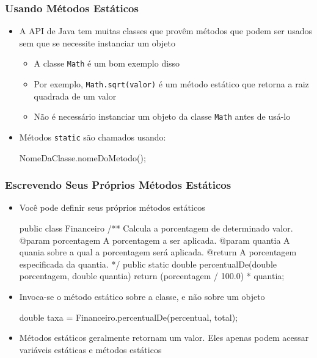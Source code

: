 \documentclass[xcolor={dvipsnames,table},aspectratio=169]{beamer}
\begin{document}
\begin{frame}[fragile]\frametitle{Usando Métodos Estáticos}
\begin{itemize}
	\item A API de Java tem muitas classes que provêm métodos que podem ser usados sem que se necessite instanciar um objeto
	\begin{itemize}
		\item A classe \texttt{Math} é um bom exemplo disso
		\item Por exemplo, \texttt{Math.sqrt(valor)} é um método estático que retorna a raiz quadrada de um valor
		\item Não é necessário instanciar um objeto da classe \texttt{Math} antes de usá-lo
	\end{itemize}
	\item Métodos \texttt{static} são chamados usando:
\begin{javacode}
NomeDaClasse.nomeDoMetodo();
\end{javacode}
\end{itemize}
\end{frame}

\begin{frame}[fragile]\frametitle{Escrevendo Seus Próprios Métodos Estáticos}
\begin{itemize}
	\item Você pode definir seus próprios métodos estáticos
{\scriptsize
\begin{javacode}
public class Financeiro {
   /** Calcula a porcentagem de determinado valor.
       @param porcentagem A porcentagem a ser aplicada.
       @param quantia A quania sobre a qual a porcentagem será aplicada.
       @return A porcentagem especificada da quantia. */
   public static double percentualDe(double porcentagem, double quantia) {
      return (porcentagem / 100.0) * quantia;
   }
}
\end{javacode}
}
	\item Invoca-se o método estático sobre a classe, e não sobre um objeto
{\scriptsize
\begin{javacode}
double taxa = Financeiro.percentualDe(percentual, total);
\end{javacode}
}
	\item Métodos estáticos geralmente retornam um valor. Eles apenas podem acessar variáveis estáticas e métodos estáticos
\end{itemize}
\end{frame}
\end{document}
